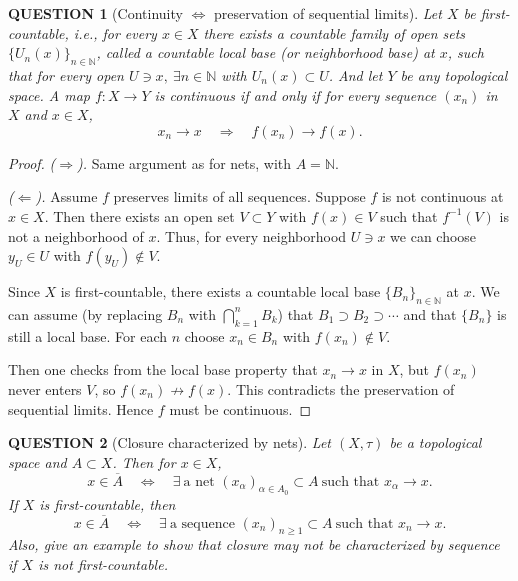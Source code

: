 \documentclass[12pt]{article}
\renewcommand{\(}{\left(}%
\renewcommand{\)}{\right)}%
\renewcommand{\[}{\left[}%
\renewcommand{\]}{\right]}%
\newtheorem{question}{QUESTION}[section]}
\newtheorem{proof}{Proof.}}
\begin{document}
\begin{question}[Continuity $\Leftrightarrow$ preservation of sequential limits]
	Let $X$ be first-countable, i.e., for every $x\in X$ there exists a countable family of open sets $\{U_n(x)\}_{n\in\mathbb{N}}$, called a \emph{countable local base} (or neighborhood base) at $x$, such that for every open $U\ni x,\ \exists n\in\mathbb{N}$ with $U_n(x)\subset U$. And let $Y$ be any topological space. A map $f:X\to Y$ is continuous if and only if for every sequence $(x_n)$ in $X$ and $x\in X$,
\begin{equation*}
x_n \to x \quad\Rightarrow\quad f(x_n)\to f(x).
\end{equation*}
\end{question}

\begin{proof}
	\emph{($\Rightarrow$).} Same argument as for nets, with $A=\mathbb{N}$.

\medskip

\emph{($\Leftarrow$).} Assume $f$ preserves limits of all sequences. Suppose $f$ is not continuous at $x\in X$. Then there exists an open set $V\subset Y$ with $f(x)\in V$ such that $f^{-1}(V)$ is not a neighborhood of $x$. Thus, for every neighborhood $U\ni x$ we can choose $y_U\in U$ with $f(y_U)\notin V$.

Since $X$ is first-countable, there exists a countable local base $\{B_n\}_{n\in\mathbb{N}}$ at $x$. We can assume (by replacing $B_n$ with $\bigcap_{k=1}^n B_k$) that $B_1\supset B_2\supset\cdots$ and that $\{B_n\}$ is still a local base. For each $n$ choose $x_n\in B_n$ with $f(x_n)\notin V$.

Then one checks from the local base property that $x_n\to x$ in $X$, but $f(x_n)$ never enters $V$, so $f(x_n)\not\to f(x)$. This contradicts the preservation of sequential limits. Hence $f$ must be continuous.
\end{proof}


\begin{question}[Closure characterized by nets]
	Let $(X,\tau)$ be a topological space and $A\subset X$. Then for $x\in X$,
\begin{equation*}
x\in \overline{A}
\quad\Longleftrightarrow\quad
\exists\ \text{a net }(x_\alpha)_{\alpha\in A_0}\subset A\ \text{such that }x_\alpha\to x.
\end{equation*}
If $X$ is first-countable, then 
\begin{equation*}
x\in \overline{A}
\quad\Longleftrightarrow\quad
\exists\ \text{a sequence }(x_n)_{n\geq 1}\subset A\ \text{such that }x_n\to x.
\end{equation*}
Also, give an example to show that closure may not be characterized by sequence if $X$ is not first-countable.
\end{question}
\end{document}
